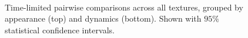 \begin{figure}[t!]
	\centering
	\\
	\caption[Time-limited pairwise comparisons across all textures, grouped by appearance and dynamics]{Time-limited pairwise comparisons across all textures, grouped by appearance (top) and dynamics (bottom).  Shown with $95\%$ statistical confidence intervals.
	}
	\label{fig:pairwise_grouped}
	\vspace{-0.2cm}
\end{figure}